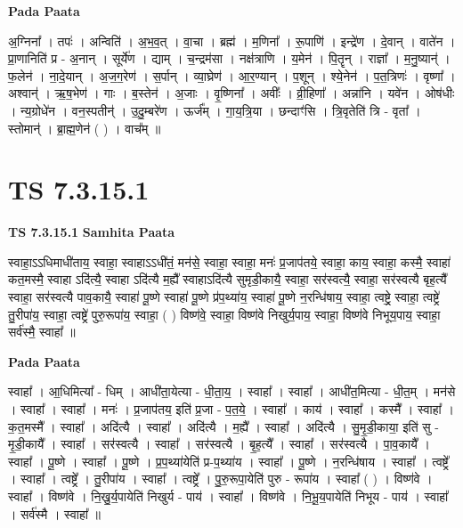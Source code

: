 \documentclass[17pt]{extarticle}
\begin{document}
\textbf{Pada Paata} \newline

अ॒ग्निना᳚ । तपः॑ । अन्विति॑ । अ॒भ॒व॒त् । वा॒चा । ब्रह्म॑ । म॒णिना᳚ । रू॒पाणि॑ । इन्द्रे॑ण । दे॒वान् । वाते॑न । प्रा॒णानिति॑ प्र - अ॒नान् । सूर्ये॑ण । द्याम् । च॒न्द्रम॑सा । नक्ष॑त्राणि । य॒मेन॑ । पि॒तॄन् । राज्ञा᳚ । म॒नु॒ष्यान्॑ । फ॒लेन॑ । ना॒दे॒यान् । अ॒ज॒ग॒रेण॑ । स॒र्पान् । व्या॒घ्रेण॑ । आ॒र॒ण्यान् । प॒शून् । श्ये॒नेन॑ । प॒त॒त्रिणः॑ । वृष्णा᳚ । अश्वान्॑ । ऋ॒ष॒भेण॑ । गाः । ब॒स्तेन॑ । अ॒जाः । वृ॒ष्णिना᳚ । अवीः᳚ । व्री॒हिणा᳚ । अन्ना॑नि । यवे॑न । ओष॑धीः । न्य॒ग्रोधे॑न । वन॒स्पतीन्॑ । उ॒दु॒म्बरे॑ण । ऊर्ज᳚म् । गा॒य॒त्रि॒या । छन्दाꣳ॑सि । त्रि॒वृतेति॑ त्रि - वृता᳚ । स्तोमान्॑ । ब्रा॒ह्म॒णेन॑ ( ) । वाच᳚म् ॥  \newline





\section{ TS 7.3.15.1 }

\textbf{TS 7.3.15.1 } \newline
\textbf{Samhita Paata} \newline

स्वाहा॒ऽऽधिमाधी॑ताय॒ स्वाहा॒ स्वाहाऽऽधी॑तं॒ मन॑से॒ स्वाहा॒ स्वाहा॒ मनः॑ प्र॒जाप॑तये॒ स्वाहा॒ काय॒ स्वाहा॒ कस्मै॒ स्वाहा॑ कत॒मस्मै॒ स्वाहा ऽदि॑त्यै॒ स्वाहा ऽदि॑त्यै म॒ह्यै᳚ स्वाहाऽदि॑त्यै सुमृडी॒कायै॒ स्वाहा॒ सर॑स्वत्यै॒ स्वाहा॒ सर॑स्वत्यै बृह॒त्यै᳚ स्वाहा॒ सर॑स्वत्यै पाव॒कायै॒ स्वाहा॑ पू॒ष्णे स्वाहा॑ पू॒ष्णे प्र॑प॒थ्या॑य॒ स्वाहा॑ पू॒ष्णे न॒रन्धि॑षाय॒ स्वाहा॒ त्वष्ट्रे॒ स्वाहा॒ त्वष्ट्रे॑ तु॒रीपा॑य॒ स्वाहा॒ त्वष्ट्रे॑ पुरु॒रूपा॑य॒ स्वाहा॒ ( ) विष्ण॑वे॒ स्वाहा॒ विष्ण॑वे निखुर्य॒पाय॒ स्वाहा॒ विष्ण॑वे निभूय॒पाय॒ स्वाहा॒ सर्व॑स्मै॒ स्वाहा᳚ ॥ \newline

\textbf{Pada Paata} \newline

स्वाहा᳚ । आ॒धिमित्या᳚ - धिम् । आधी॑ता॒येत्या - धी॒ता॒य॒ । स्वाहा᳚ । स्वाहा᳚ । आधी॑त॒मित्या - धी॒त॒म् । मन॑से । स्वाहा᳚ । स्वाहा᳚ । मनः॑ । प्र॒जाप॑तय॒ इति॑ प्र॒जा - प॒त॒ये॒ । स्वाहा᳚ । काय॑ । स्वाहा᳚ । कस्मै᳚ । स्वाहा᳚ । क॒त॒मस्मै᳚ । स्वाहा᳚ । अदि॑त्यै । स्वाहा᳚ । अदि॑त्यै । म॒ह्यै᳚ । स्वाहा᳚ । अदि॑त्यै । सु॒मृ॒डी॒काया॒ इति॑ सु - मृ॒डी॒कायै᳚ । स्वाहा᳚ । सर॑स्वत्यै । स्वाहा᳚ । सर॑स्वत्यै । बृ॒ह॒त्यै᳚ । स्वाहा᳚ । सर॑स्वत्यै । पा॒व॒कायै᳚ । स्वाहा᳚ । पू॒ष्णे । स्वाहा᳚ । पू॒ष्णे । प्र॒प॒थ्या॑येति॑ प्र-प॒थ्या॑य । स्वाहा᳚ । पू॒ष्णे । न॒रन्धि॑षाय । स्वाहा᳚ । त्वष्ट्रे᳚ । स्वाहा᳚ । त्वष्ट्रे᳚ । तु॒रीपा॑य । स्वाहा᳚ । त्वष्ट्रे᳚ । पु॒रु॒रूपा॒येति॑ पुरु - रूपा॑य । स्वाहा᳚ ( ) । विष्ण॑वे । स्वाहा᳚ । विष्ण॑वे । नि॒खु॒र्य॒पायेति॑ निखुर्य - पाय॑ । स्वाहा᳚ । विष्ण॑वे । नि॒भू॒य॒पायेति॑ निभूय - पाय॑ । स्वाहा᳚ । सर्व॑स्मै । स्वाहा᳚ ॥  \newline
\end{document}
